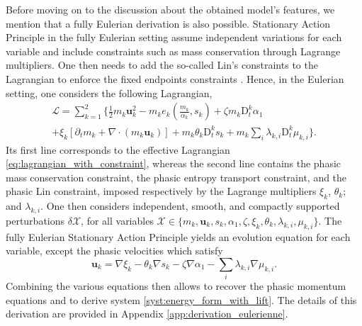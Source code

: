 \documentclass{myclass}
\newcommand{\Lag}{\mathscr{L}}
\newcommand{\Dt}{\mathrm{D}_t}
\newcommand{\vel}{\bm{u}}
\newcommand{\pth}[1]  {\left( #1 \right)}
\newcommand{\brck}[1]  {\left[ #1 \right]}
\begin{document}
Before moving on to the discussion about the obtained model's features, we mention that a fully Eulerian derivation is also possible. Stationary Action Principle in the fully Eulerian setting assume independent variations for each variable and include constraints such as mass conservation through Lagrange multipliers. One then needs to add the so-called Lin's constraints to the Lagrangian to enforce the fixed endpoints constraints \cite{bretherton:1970}. Hence, in the Eulerian setting, one considers the following Lagrangian,
\begin{multline}\label{eq:Lagrangian_Lin}
\Lag = \sum_{k=1}^{2}\Bigg\{\tfrac{1}{2}m_k\vel_k^2 - m_k e_k\pth{\frac{m_k}{\alpha_k},s_k} + \zeta m_k\Dt^k\alpha_1 \\
 + \xi_k\brck{\partial_t m_k + \nabla\cdot\pth{m_k\vel_k}} + m_k\theta_k\Dt^k s_k + m_k\sum_{i}\lambda_{k,i}\Dt^k\mu_{k,i}\Bigg\}.
\end{multline}
Its first line corresponds to the effective Lagrangian \eqref{eq:lagrangian_with_constraint}, whereas the second line contains the phasic mass conservation constraint, the phasic entropy transport constraint, and the phasic Lin constraint, imposed respectively by the Lagrange multipliers $\xi_k$, $\theta_k$; and $\lambda_{k,i}$. One then considers independent, smooth, and compactly supported perturbations $\delta\mathcal{X}$, for all variables $\mathcal{X}\in\{m_k,\vel_k,s_k,\alpha_1,\zeta,\xi_k,\theta_k,\lambda_{k,i},\mu_{k,i}\}$. The fully Eulerian Stationary Action Principle yields an evolution equation for each variable, except the phasic velocities which satisfy 
\begin{equation}
\vel_k =  \nabla\xi_k - \theta_k\nabla s_k - \zeta\nabla\alpha_1 - \sum_{i}\lambda_{k,i}\nabla\mu_{k,i}. 
\label{eq:Clebsch_representation_vel_k}
\end{equation}
Combining the various equations then allows to recover the phasic momentum equations and to derive system \eqref{syst:energy_form_with_lift}. The details of this derivation are provided in Appendix \ref{app:derivation_eulerienne}.
\end{document}
